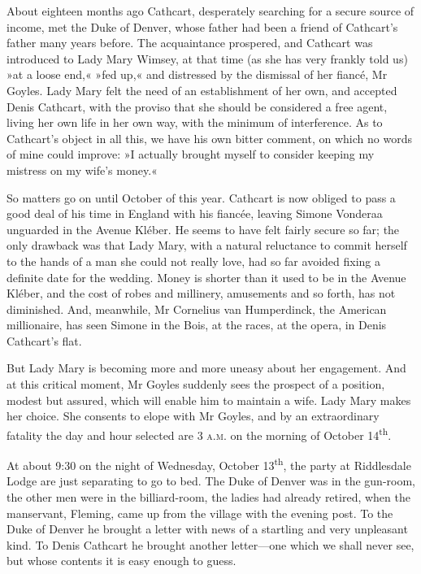 \begin{dialogue}
About eighteen months ago Cathcart, desperately searching for a secure source of income, met the Duke of Denver, whose father had been a friend of Cathcart's father many years before. The acquaintance prospered, and Cathcart was introduced to Lady Mary Wimsey, at that time (as she has very frankly told us) »at a loose end,« »fed up,« and distressed by the dismissal of her fiancé, Mr Goyles. Lady Mary felt the need of an establishment of her own, and accepted Denis Cathcart, with the proviso that she should be considered a free agent, living her own life in her own way, with the minimum of interference. As to Cathcart's object in all this, we have his own bitter comment, on which no words of mine could improve: »I actually brought myself to consider keeping my mistress on my wife's money.«

\smallskip 

So matters go on until October of this year. Cathcart is now obliged to pass a good deal of his time in England with his fiancée, leaving Simone Vonderaa unguarded in the Avenue Kléber. He seems to have felt fairly secure so far; the only drawback was that Lady Mary, with a natural reluctance to commit herself to the hands of a man she could not really love, had so far avoided fixing a definite date for the wedding. Money is shorter than it used to be in the Avenue Kléber, and the cost of robes and millinery, amusements and so forth, has not diminished. And, meanwhile, Mr Cornelius van Humperdinck, the American millionaire, has seen Simone in the Bois, at the races, at the opera, in Denis Cathcart's flat.

\smallskip 

But Lady Mary is becoming more and more uneasy about her engagement. And at this critical moment, Mr Goyles suddenly sees the prospect of a position, modest but assured, which will enable him to maintain a wife. Lady Mary makes her choice. She consents to elope with Mr Goyles, and by an extraordinary fatality the day and hour selected are 3 \textsc{a.m.} on the morning of October 14\textsuperscript{th}.

\smallskip 

At about 9:30 on the night of Wednesday, October 13\textsuperscript{th}, the party at Riddlesdale Lodge are just separating to go to bed. The Duke of Denver was in the gun-room, the other men were in the billiard-room, the ladies had already retired, when the manservant, Fleming, came up from the village with the evening post. To the Duke of Denver he brought a letter with news of a startling and very unpleasant kind. To Denis Cathcart he brought another letter—one which we shall never see, but whose contents it is easy enough to guess.


\end{dialogue}
